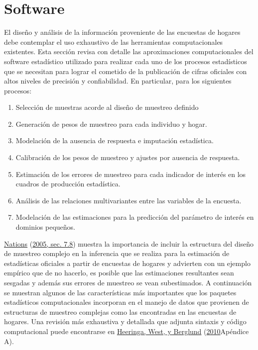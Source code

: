 \documentclass[
  12pt,
  spanish,
]{book}
\providecommand{\tightlist}{%
  \setlength{\itemsep}{0pt}\setlength{\parskip}{0pt}}
\begin{document}
\hypertarget{software}{%
\section{Software}\label{software}}

El diseño y análisis de la información proveniente de las encuestas de hogares debe contemplar el uso exhaustivo de las herramientas computacionales existentes. Esta sección revisa con detalle las aproximaciones computacionales del software estadístico utilizado para realizar cada uno de los procesos estadísticos que se necesitan para lograr el cometido de la publicación de cifras oficiales con altos niveles de precisión y confiabilidad. En particular, para los siguientes procesos:

\begin{enumerate}
\def\labelenumi{\arabic{enumi}.}
\tightlist
\item
  Selección de muestras acorde al diseño de muestreo definido
\item
  Generación de pesos de muestreo para cada individuo y hogar.
\item
  Modelación de la ausencia de respuesta e imputación estadística.
\item
  Calibración de los pesos de muestreo y ajustes por ausencia de respuesta.
\item
  Estimación de los errores de muestreo para cada indicador de interés en los cuadros de producción estadística.
\item
  Análisis de las relaciones multivariantes entre las variables de la encuesta.
\item
  Modelación de las estimaciones para la predicción del parámetro de interés en dominios pequeños.
\end{enumerate}

\protect\hyperlink{ref-United_Nations_2005}{Nations} (\protect\hyperlink{ref-United_Nations_2005}{2005, sec. 7.8}) muestra la importancia de incluir la estructura del diseño de muestreo complejo en la inferencia que se realiza para la estimación de estadísticas oficiales a partir de encuestas de hogares y advierten con un ejemplo empírico que de no hacerlo, es posible que las estimaciones resultantes sean sesgadas y además sus errores de muestreo se vean subestimados. A continuación se muestran algunos de las características más importantes que los paquetes estadísticos computacionales incorporan en el manejo de datos que provienen de estructuras de muestreo complejas como las encontradas en las encuestas de hogares. Una revisión más exhaustiva y detallada que adjunta sintaxis y código computacional puede encontrarse en \protect\hyperlink{ref-Heeringa_West_Berglund_2010}{Heeringa, West, y Berglund} (\protect\hyperlink{ref-Heeringa_West_Berglund_2010}{2010}Apéndice A).
\end{document}
